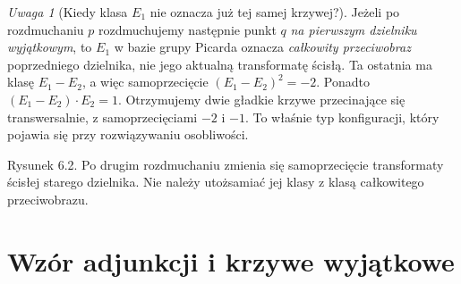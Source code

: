 \documentclass[11pt,a4paper,openany]{report}
\numberwithin{equation}{section}
\theoremstyle{plain}
\theoremstyle{definition}
\theoremstyle{remark}
\newtheorem{uwaga}[twierdzenie]{Uwaga}
\begin{document}
\begin{uwaga}[Kiedy klasa $E_1$ nie oznacza już tej samej krzywej?]
\label{uw:ga6-infinitely-near}
Jeżeli po rozdmuchaniu $p$ rozdmuchujemy następnie punkt
$q$ \emph{na pierwszym dzielniku wyjątkowym}, to
$E_1$ w bazie grupy Picarda oznacza \emph{całkowity
przeciwobraz} poprzedniego dzielnika, nie jego aktualną
transformatę ścisłą. Ta ostatnia ma klasę $E_1-E_2$,
a więc samoprzecięcie $(E_1-E_2)^2=-2$.
Ponadto $(E_1-E_2)\cdot E_2=1$. Otrzymujemy dwie
gładkie krzywe przecinające się transwersalnie,
z samoprzecięciami $-2$ i $-1$. To właśnie typ
konfiguracji, który pojawia się przy rozwiązywaniu
osobliwości.
\end{uwaga}

\begin{center}
\begin{minipage}{\linewidth}
\centering
{}

{\small Rysunek 6.2. Po drugim rozdmuchaniu zmienia się samoprzecięcie transformaty ścisłej starego dzielnika. Nie należy utożsamiać jej klasy z klasą całkowitego przeciwobrazu.}\par
\end{minipage}
\end{center}

\section{Wzór adjunkcji i krzywe wyjątkowe}
\label{sec:ga6-adjunction}
\end{document}
